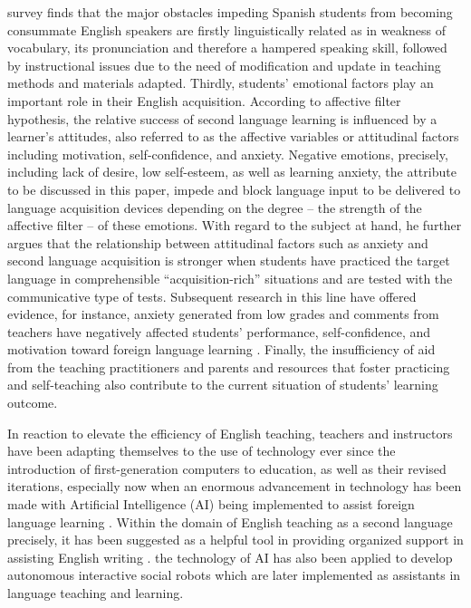 \documentclass[english]{textolivre}
\begin{document}
 survey finds that the major obstacles impeding Spanish students from becoming consummate English speakers are firstly linguistically related as in weakness of vocabulary, its pronunciation and therefore a hampered speaking skill, followed by instructional issues due to the need of modification and update in teaching methods and materials adapted. Thirdly, students’ emotional factors play an important role in their English acquisition. According to  affective filter hypothesis, the relative success of second language learning is influenced by a learner's attitudes, also referred to as the affective variables or attitudinal factors including motivation, self-confidence, and anxiety. Negative emotions, precisely, including lack of desire, low self-esteem, as well as learning anxiety, the attribute to be discussed in this paper, impede and block language input to be delivered to language acquisition devices depending on the degree – the strength of the affective filter – of these emotions. With regard to the subject at hand, he further argues that the relationship between attitudinal factors such as anxiety and second language acquisition is stronger when students have practiced the target language in comprehensible “acquisition-rich” situations and are tested with the communicative type of tests. Subsequent research in this line have offered evidence, for instance, anxiety generated from low grades and comments from teachers have negatively affected students’ performance, self-confidence, and motivation toward foreign language learning \cite{chen_relationship_2004, dewaele_does_2018}. Finally, the insufficiency of aid from the teaching practitioners and parents and resources that foster practicing and self-teaching also contribute to the current situation of students’ learning outcome.

In reaction to elevate the efficiency of English teaching, teachers and instructors have been adapting themselves to the use of technology ever since the introduction of first-generation computers to education, as well as their revised iterations, especially now when an enormous advancement in technology has been made with Artificial Intelligence (AI) being implemented to assist foreign language learning \cite{tahiru_ai_2021}. Within the domain of English teaching as a second language precisely, it has been suggested as a helpful tool in providing organized support in assisting English writing \cite{gayed_exploring_2022}. the technology of AI has also been applied to develop autonomous interactive social robots which are later implemented as assistants in language teaching and learning. 
\end{document}

